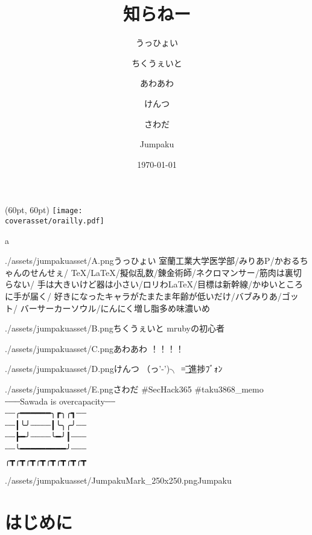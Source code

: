 \documentclass[autodetect-engine,dvipdfmx-if-dvi,ja=standard,a5paper,12pt,twoside,openany,layout=v2,tombow]{bxjsbook}
\title{知らねー}
\author{うっひょい \and ちくうぇいと \and あわあわ \and けんつ \and さわだ \and Jumpaku}
\date{\today}
\newcommand{\articlepath}{./articles}
\newcommand{\assetspath}{./assets}
\newcommand{\coverasset}{\assetspath/coverasset}
\newcommand{\jumpakuasset}{\assetspath/jumpakuasset}
\begin{document}
\begin{titlepage}
  \begin{textblock*}{\hsize}(60pt, 60pt)
    \centering
    \texttt{[image: \\coverasset/orailly.pdf]}
  \end{textblock*}
  a
\end{titlepage}
\maketitle
\frontmatter

\begin{myintroduce}{\jumpakuasset/A.png}{うっひょい}
  室蘭工業大学医学部/みりあP/かおるちゃんのせんせぇ/
  TeX/LaTeX/擬似乱数/錬金術師/ネクロマンサー/筋肉は裏切らない/
  手は大きいけど器は小さい/ロリわLaTeX/目標は新幹線/かゆいところに手が届く/
  好きになったキャラがたまたま年齢が低いだけ/バブみりあ/ゴット/
  バーサーカーソウル/にんにく増し脂多め味濃いめ
\end{myintroduce}
\begin{myintroduce}{\jumpakuasset/B.png}{ちくうぇいと}
  mrubyの初心者
\end{myintroduce}
\begin{myintroduce}{\jumpakuasset/C.png}{あわあわ}
  ！！！！
\end{myintroduce}
\begin{myintroduce}{\jumpakuasset/D.png}{けんつ}
  （っ'-')╮ =͟͟͞͞ 進捗ﾌﾞｫﾝ
\end{myintroduce}
\begin{myintroduce}{\jumpakuasset/E.png}{さわだ}
  \#SecHack365 \#taku3868\_memo \\┈┈┈Sawada is overcapacity┈┈ \\
   ┈┈╭━━━━━━╮┏╮╭┓┈┈ \\
   ┈┈┃╰╯┈┈┈┈┃╰╮╭╯┈┈ \\
   ┈┈┣━╯┈┈┈┈╰━╯┃┈┈┈ \\
   ┈┈╰━━━━━━━━━╯┈┈┈ \\
   ╭┳╭┳╭┳╭┳╭┳╭┳╭┳╭┳
\end{myintroduce}
\begin{myintroduce}{\jumpakuasset/JumpakuMark_250x250.png}{Jumpaku}

\end{myintroduce}

\chapter{はじめに}


\tableofcontents
\mainmatter
{}
\end{document}

